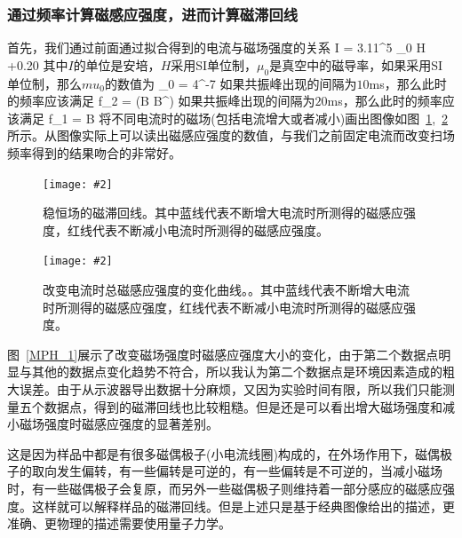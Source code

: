 \documentclass{ctexart}
\newcommand{\cpic}[2]{
\begin{center}
\texttt{[image: \#2]}
\end{center}
}
\newcommand{\cpicn}[3]
{
\begin{figure}[H]
\cpic{#1}{#2}
\caption{#3\label{#2}}
\end{figure}
}
\begin{document}
\subsubsection{通过频率计算磁感应强度，进而计算磁滞回线}
首先，我们通过前面通过拟合得到的电流与磁场强度的关系
\beq
I = 3.11^5 \mu_0 H +0.20
\eeq
其中$I$的单位是安培，$H$采用SI单位制，$\mu_0$是真空中的磁导率，如果采用SI单位制，那么$mu_0$的数值为
\beq
\mu_0 = 4\pi {}^{-7}
\eeq
如果共振峰出现的间隔为$10$ms，那么此时的频率应该满足
\pi f_2 = \gamma (B \pm B^{\prime})
\eeq
如果共振峰出现的间隔为$20$ms，那么此时的频率应该满足
\pi f_1 = \gamma B
\eeq
将不同电流时的磁场(包括电流增大或者减小)画出图像如图~\ref{MHL_1},~\ref{MHL_2}所示。从图像实际上可以读出磁感应强度的数值，与我们之前固定电流而改变扫场频率得到的结果吻合的非常好。
\cpicn{0.5}{MHL_1}{稳恒场的磁滞回线。其中蓝线代表不断增大电流时所测得的磁感应强度，红线代表不断减小电流时所测得的磁感应强度。}
\cpicn{0.5}{MHL_2}{改变电流时总磁感应强度的变化曲线。。其中蓝线代表不断增大电流时所测得的磁感应强度，红线代表不断减小电流时所测得的磁感应强度。}

图~\ref{MPH_1}展示了改变磁场强度时磁感应强度大小的变化，由于第二个数据点明显与其他的数据点变化趋势不符合，所以我认为第二个数据点是环境因素造成的粗大误差。由于从示波器导出数据十分麻烦，又因为实验时间有限，所以我们只能测量五个数据点，得到的磁滞回线也比较粗糙。但是还是可以看出增大磁场强度和减小磁场强度时磁感应强度的显著差别。

这是因为样品中都是有很多磁偶极子(小电流线圈)构成的，在外场作用下，磁偶极子的取向发生偏转，有一些偏转是可逆的，有一些偏转是不可逆的，当减小磁场时，有一些磁偶极子会复原，而另外一些磁偶极子则维持着一部分感应的磁感应强度。这样就可以解释样品的磁滞回线。但是上述只是基于经典图像给出的描述，更准确、更物理的描述需要使用量子力学。
\end{document}
